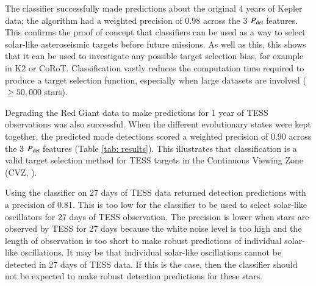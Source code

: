 \documentclass[a4paper,fleqn,usenatbib,useAMS]{mnras}
\newcommand{\kep}{\ensuremath{Kepler}\:}
\newcommand{\pdet}{\ensuremath{P_{\rm det}\:}}
\begin{document}
The classifier successfully made predictions about the original 4 years of Kepler data; the algorithm had a weighted precision of 0.98 across the 3 \pdet features. This confirms the proof of concept that classifiers can be used as a way to select solar-like asteroseismic targets before future missions. As well as this, this shows that it can be used to investigate any possible target selection bias, for example in K2 or CoRoT. Classification vastly reduces the computation time required to produce a target selection function, especially when large datasets are involved ($\geq50,000$ stars).  

Degrading the Red Giant data to make predictions for 1 year of TESS observations was also successful. When the different evolutionary states were kept together, the predicted mode detections scored a weighted precision of 0.90 across the 3 \pdet features (Table \ref{tab: results}). This illustrates that classification is a valid target selection method for TESS targets in the Continuous Viewing Zone (CVZ, \citep{ricker_transiting_2014}).

Using the classifier on 27 days of TESS data returned detection predictions with a precision of 0.81. This is too low for the classifier to be used to select solar-like oscillators for 27 days of TESS observation. The precision is lower when stars are observed by TESS for 27 days because the white noise level is too high and the length of observation is too short to make robust predictions of individual solar-like oscillations. It may be that individual solar-like oscillations cannot be detected in 27 days of TESS data. If this is the case, then the classifier should not be expected to make robust detection predictions for these stars.









\bsp
\label{lastpage}
\end{document}

